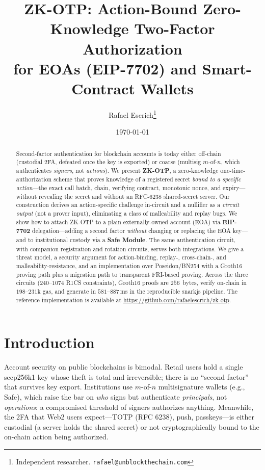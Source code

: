\documentclass[11pt]{article}
\title{ZK-OTP: Action-Bound Zero-Knowledge Two-Factor Authorization\\
for EOAs (EIP-7702) and Smart-Contract Wallets}
\author{Rafael Escrich\thanks{Independent researcher. \texttt{rafael@unblockthechain.com}}}
\date{\today}
\theoremstyle{definition}
\theoremstyle{plain}
\begin{document}
\maketitle

\begin{abstract}
Second-factor authentication for blockchain accounts is today either off-chain
(custodial 2FA, defeated once the key is exported) or coarse (multisig $m$-of-$n$,
which authenticates \emph{signers}, not \emph{actions}). We present \textbf{ZK-OTP},
a zero-knowledge one-time-authorization scheme that proves knowledge of a
registered secret \emph{bound to a specific action}---the exact call batch, chain,
verifying contract, monotonic nonce, and expiry---without revealing the secret and
without an RFC-6238 shared-secret server. Our construction derives an
action-specific challenge in-circuit and a nullifier as a \emph{circuit output}
(not a prover input), eliminating a class of malleability and replay bugs. We show
how to attach ZK-OTP to a plain externally-owned account (EOA) via \textbf{EIP-7702}
delegation---adding a second factor \emph{without} changing or replacing the EOA
key---and to institutional custody via a \textbf{Safe Module}. The same
authentication circuit, with companion registration and rotation circuits, serves
both integrations. We
give a threat model, a security argument for action-binding, replay-, cross-chain-,
and malleability-resistance, and an implementation over Poseidon/BN254 with a
Groth16 proving path plus a migration path to transparent FRI-based proving.
Across the three circuits ($240$--$1074$ R1CS constraints), Groth16 proofs are
$256$~bytes, verify on-chain in $198$--$231$k gas, and generate in
$581$--$887$\,ms in the reproducible snarkjs pipeline. The reference
implementation is available at \url{https://github.com/rafaelescrich/zk-otp}.
\end{abstract}

\section{Introduction}
\label{sec:intro}

Account security on public blockchains is bimodal. Retail users hold a single
secp256k1 key whose theft is total and irreversible; there is no ``second factor''
that survives key export. Institutions use $m$-of-$n$ multisignature wallets (e.g.,
Safe), which raise the bar on \emph{who} signs but authenticate \emph{principals},
not \emph{operations}: a compromised threshold of signers authorizes anything.
Meanwhile, the 2FA that Web2 users expect---TOTP (RFC 6238), push, passkeys---is
either custodial (a server holds the shared secret) or not cryptographically bound
to the on-chain action being authorized.
\end{document}
